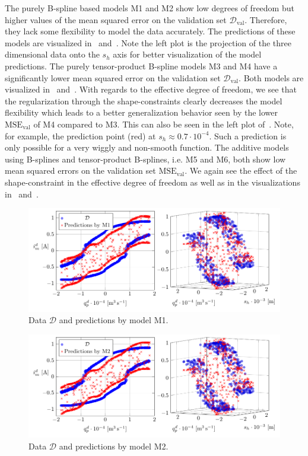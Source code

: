 The purely B-spline based models M1 and M2 show low degrees of freedom but higher values of the mean squared error on the validation set $\mathcal{D}_{\text{val}}$. Therefore, they lack some flexibility to model the data accurately. The predictions of these models are visualized in~ and~. Note the left plot is the projection of the three dimensional data onto the $s_h$ axis for better visualization of the model predictions. The purely tensor-product B-spline models M3 and M4 have a significantly lower mean squared error on the validation set $\mathcal{D}_{\text{val}}$. Both models are visualized in~ and~. With regards to the effective degree of freedom, we see that the regularization through the shape-constraints clearly decreases the model flexibility which leads to a better generalization behavior seen by the lower $\text{MSE}_{\text{val}}$ of M4 compared to M3. This can also be seen in the left plot of~. Note, for example, the prediction point (red) at $s_h \approx 0.7 \cdot 10^{-4}$. Such a prediction is only possible for a very wiggly and non-smooth function. The additive models using B-splines and tensor-product B-splines, i.e. M5 and M6, both show low mean squared errors on the validation set $\text{MSE}_{\text{val}}$. We again see the effect of the shape-constraint in the effective degree of freedom as well as in the visualizations in~ and~. 

\begin{figure}[H]
	\centering 
	\includegraphics{graphics/pgfplots/cha5/Bosch/M1.pdf}
	\caption{Data $\mathcal{D}$ and predictions by model M1.}
	\label{fig:bosch-M1}
\end{figure}

\begin{figure}[H]
	\centering 
	\includegraphics{graphics/pgfplots/cha5/Bosch/M2.pdf}
	\caption{Data $\mathcal{D}$ and predictions by model M2.}
	\label{fig:bosch-M2}
\end{figure}

